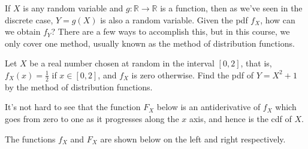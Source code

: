 If $X$ is any random variable and $g: \mathbb{R} \to \mathbb{R}$ is a function, then as we've seen in the discrete case, $Y = g(X)$ is also a random variable. Given the pdf $f_X$, how can we obtain $f_Y$? There are a few ways to accomplish this, but in this course, we only cover one method, usually known as the method of distribution functions. %

\begin{examp}\label{MethodDistributionEx}Let $X$ be a real number chosen at random in the interval $[0,2]$, that is, $f_X(x) = \frac{1}{2}$ if $x \in [0,2]$, and $f_X$ is zero otherwise. Find the pdf of $Y = X^2 + 1$ by the method of distribution functions.
\par
\noindent It's not hard to see that the function $F_X$ below is an antiderivative of $f_X$ which goes from zero to one as it progresses along the $x$ axis, and hence is the cdf of $X$.
\renewcommand*{\arraystretch}{1.35}
\renewcommand*{\arraystretch}{1}
\par
\noindent The functions $f_X$ and $F_X$ are shown below on the left and right respectively.


\end{examp}
